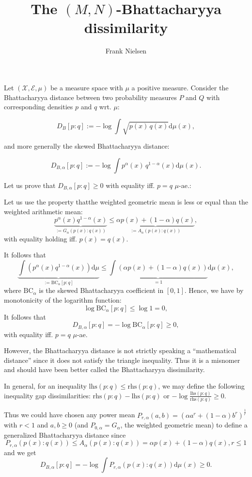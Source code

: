 \documentclass{article}
\title{The $(M,N)$-Bhattacharyya dissimilarity}
\author{Frank Nielsen}
\date{}
\def\dmu{\mathrm{d}\mu}
\def\BC{\mathrm{BC}}
\def\lhs{\mathrm{lhs}}
\def\rhs{\mathrm{rhs}}
\def\calX{\mathcal{X}}
\def\calE{\mathcal{E}}
\begin{document}
\maketitle
%
%
%
%

Let $(\calX,\calE,\mu)$ be a measure space with $\mu$ a positive measure.
Consider the Bhattacharyya distance between two probability measures $P$ and $Q$ with corresponding densities $p$ and $q$ wrt.  $\mu$:

$$
D_B[p:q]:=-\log \int \sqrt{p(x)\, q(x)} \dmu(x),
$$

and more generally the skewed Bhattacharyya distance:

$$
D_{B,\alpha}[p:q]:=-\log \int p^\alpha(x)\, q^{1-\alpha}(x) \dmu(x).
$$

Let us prove that $D_{B,\alpha}[p:q]\geq 0$ with equality iff. $p=q$ $\mu$-ae.:

Let us use the property thatthe weighted geometric mean  is less or equal than the weighted arithmetic mean:
$$
\underbrace{p^\alpha(x)q^{1-\alpha}(x)}_{:=G_\alpha(p(x):q(x))} \leq \underbrace{\alpha p(x)+(1-\alpha) q(x)}_{:=A_\alpha(p(x):q(x))},
$$
with equality holding iff. $p(x)=q(x)$.

It follows that
$$
\underbrace{\int \left(p^\alpha(x)q^{1-\alpha}(x)\right)\dmu}_{:=\BC_\alpha[p:q]} \leq \underbrace{\int \left(\alpha p(x)+(1-\alpha) q(x)\right)}_{=1}\dmu(x),
$$
where $\BC_\alpha$ is the skewed Bhattacharyya coefficient in $[0,1]$.
Hence, we have by monotonicity of the logarithm function:
$$
\log \BC_\alpha[p:q]\leq \log 1=0,
$$
It follows that
$$
D_{B,\alpha}[p:q]=-\log\BC_\alpha[p:q]\geq 0,
$$
with equality iff. $p=q$ $\mu$-ae.

However, the Bhattacharyya distance is not strictly speaking a ``mathematical distance'' since it does not satisfy the triangle inequality.
Thus it is a misnomer and should have been better called the Bhattacharyya dissimilarity.

In general, for an inequality $\lhs(p:q) \leq \rhs(p:q)$, we may define the following inequality gap dissimilarities: $\rhs(p:q)-\lhs(p:q)$ or $-\log\frac{\lhs(p:q)}{\rhs(p:q)}\geq 0$.


Thus we could have chosen any power mean $P_{r,\alpha}(a,b)=(\alpha a^r+(1-\alpha)b^r)^{\frac{1}{r}}$ with $r<1$ and $a,b\geq 0$ (and $P_{0,\alpha}=G_\alpha$, the weighted geometric mean) to define a generalized Bhattacharyya distance since
$$
P_{r,\alpha}(p(x):q(x))\leq A_\alpha(p(x):q(x))=\alpha p(x)+(1-\alpha)q(x), r\leq 1
$$
and we get
$$
D_{B,\alpha}[p:q]=-\log \int P_{r,\alpha}(p(x):q(x)) \dmu(x)\geq 0.
$$
\end{document}
